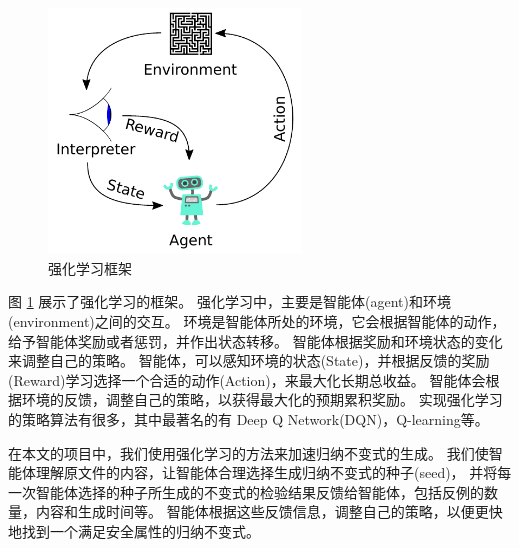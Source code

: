\begin{figure}[h]
    \centering
    \includegraphics[width=0.6\textwidth]{figures/Reinforcement_learning_diagram.pdf}
    \caption{强化学习框架}
    \label{fig:rl}
\end{figure}
图 \ref{fig:rl} 展示了强化学习的框架。
强化学习中，主要是智能体(agent)和环境(environment)之间的交互。
环境是智能体所处的环境，它会根据智能体的动作，给予智能体奖励或者惩罚，并作出状态转移。
智能体根据奖励和环境状态的变化来调整自己的策略。
智能体，可以感知环境的状态(State)，并根据反馈的奖励(Reward)学习选择一个合适的动作(Action)，来最大化长期总收益。
智能体会根据环境的反馈，调整自己的策略，以获得最大化的预期累积奖励。
实现强化学习的策略算法有很多，其中最著名的有 Deep Q Network(DQN)\cite{dqn}，Q-learning\cite{q-learning}等。

在本文的项目中，我们使用强化学习的方法来加速归纳不变式的生成。
我们使智能体理解\TLA 原文件的内容，让智能体合理选择生成归纳不变式的种子(seed)，
并将每一次智能体选择的种子所生成的不变式的检验结果反馈给智能体，包括反例的数量，内容和生成时间等。
智能体根据这些反馈信息，调整自己的策略，以便更快地找到一个满足安全属性的归纳不变式。

